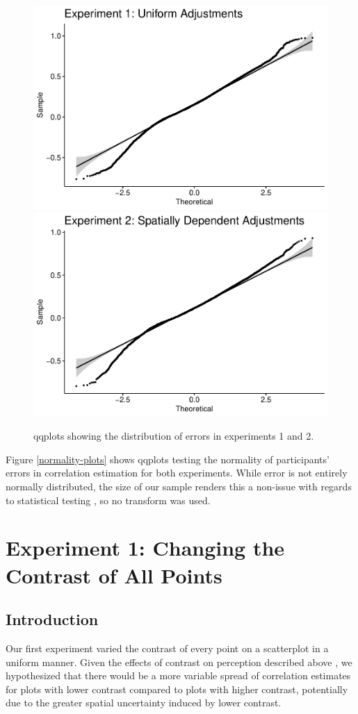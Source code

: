 \documentclass[preprint, 3p,
authoryear]{elsarticle} %
\begin{document}
\begin{figure}

\includegraphics[width=0.5\linewidth]{contrast_and_scatterplots_files/figure-latex/normality-plots-1} \includegraphics[width=0.5\linewidth]{contrast_and_scatterplots_files/figure-latex/normality-plots-2} \hfill{}

\caption{\label{normality-plots}qqplots showing the distribution of errors in experiments 1 and 2.}\label{fig:normality-plots}
\end{figure}

Figure \ref{normality-plots} shows qqplots testing the normality of
participants' errors in correlation estimation for both experiments.
While error is not entirely normally distributed, the size of our sample
renders this a non-issue with regards to statistical testing
\citep{ghasemi_2012}, so no transform was used.

\hypertarget{experiment-1-changing-the-contrast-of-all-points}{%
\section{Experiment 1: Changing the Contrast of All
Points}\label{experiment-1-changing-the-contrast-of-all-points}}

\hypertarget{introduction-1}{%
\subsection{Introduction}\label{introduction-1}}

Our first experiment varied the contrast of every point on a scatterplot
in a uniform manner. Given the effects of contrast on perception
described above \citep{champion_2017, wehrhahn_1990}, we hypothesized
that there would be a more variable spread of correlation estimates for
plots with lower contrast compared to plots with higher contrast,
potentially due to the greater spatial uncertainty induced by lower
contrast.
\end{document}
